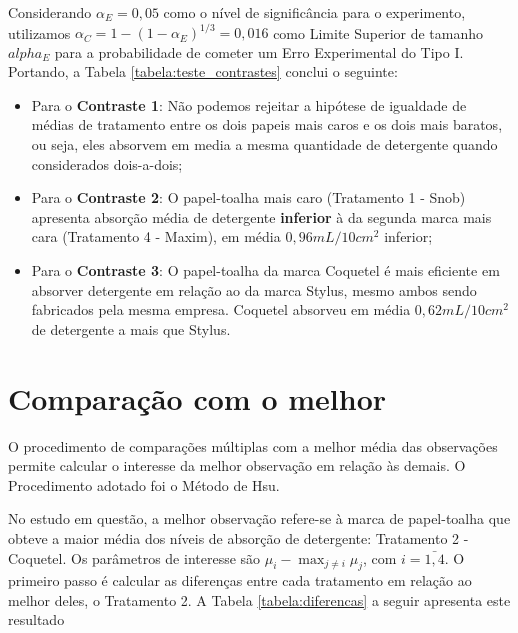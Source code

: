 \documentclass[a4paper,12pt,notitlepage]{article}
\begin{document}
Considerando $\alpha_E = 0,05$ como o nível de significância para o experimento, utilizamos $\alpha_C = 1 - (1-\alpha_E)^{1/3} = 0,016$ como Limite Superior de tamanho $alpha_E$ para a probabilidade de cometer um Erro Experimental do Tipo I. Portando, a Tabela \ref{tabela:teste_contrastes} conclui o seguinte:

\begin{itemize}
    \item Para o \textbf{Contraste 1}: Não podemos rejeitar a hipótese de igualdade de médias de tratamento entre os dois papeis mais caros e os dois mais baratos, ou seja, eles absorvem em media a mesma quantidade de detergente quando considerados dois-a-dois;
    \item Para o \textbf{Contraste 2}: O papel-toalha mais caro (Tratamento 1 - Snob) apresenta absorção média de detergente \textbf{inferior} à da segunda marca mais cara (Tratamento 4 - Maxim), em média $0,96mL/10cm^2$ inferior;
    \item Para o \textbf{Contraste 3}: O papel-toalha da marca Coquetel é mais eficiente em absorver detergente em relação ao da marca Stylus, mesmo ambos sendo fabricados pela mesma empresa. Coquetel absorveu em média $0,62 mL/10cm^2$ de detergente a mais que Stylus.
\end{itemize}



\section{Comparação com o melhor}\label{sec:cm}
O procedimento de comparações múltiplas com a melhor média das 
observações permite calcular o interesse da melhor observação em relação às demais. O Procedimento adotado foi o Método de Hsu.

No estudo em questão, a melhor observação refere-se à  marca de papel-toalha que obteve a maior média dos níveis de absorção de detergente: Tratamento 2 - Coquetel. Os parâmetros de interesse são $\mu_i - \max_{j\neq i} \mu_j$, com $i = \bar{1,4}$. O primeiro passo é calcular as diferenças entre cada tratamento em relação ao melhor deles, o Tratamento 2. A Tabela \ref{tabela:diferencas} a seguir apresenta este resultado
\end{document}
